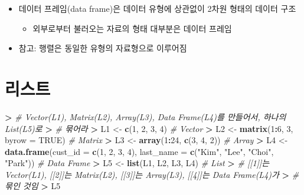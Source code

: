 \documentclass[11pt,a4paper]{book}
\newenvironment{Shaded}{\begin{snugshade}}{\end{snugshade}}
\newcommand{\KeywordTok}[1]{\textcolor[rgb]{0.13,0.29,0.53}{\textbf{#1}}}
\newcommand{\DataTypeTok}[1]{\textcolor[rgb]{0.13,0.29,0.53}{#1}}
\newcommand{\DecValTok}[1]{\textcolor[rgb]{0.00,0.00,0.81}{#1}}
\newcommand{\StringTok}[1]{\textcolor[rgb]{0.31,0.60,0.02}{#1}}
\newcommand{\CommentTok}[1]{\textcolor[rgb]{0.56,0.35,0.01}{\textit{#1}}}
\newcommand{\OtherTok}[1]{\textcolor[rgb]{0.56,0.35,0.01}{#1}}
\newcommand{\OperatorTok}[1]{\textcolor[rgb]{0.81,0.36,0.00}{\textbf{#1}}}
\newcommand{\ErrorTok}[1]{\textcolor[rgb]{0.64,0.00,0.00}{\textbf{#1}}}
\newcommand{\NormalTok}[1]{#1}
\providecommand{\tightlist}{%
  \setlength{\itemsep}{0pt}\setlength{\parskip}{0pt}}
\theoremstyle{definition}
\theoremstyle{definition}
\theoremstyle{definition}
\theoremstyle{remark}
\begin{document}
\begin{itemize}
\tightlist
\item
  데이터 프레임(data frame)은 데이터 유형에 상관없이 2차원 형태의 데이터
  구조

  \begin{itemize}
  \tightlist
  \item
    외부로부터 불러오는 자료의 형태 대부분은 데이터 프레임
  \end{itemize}
\item
  참고: 행렬은 동일한 유형의 자료형으로 이루어짐
\end{itemize}

\section{리스트}

\footnotesize

\begin{Shaded}
\begin{Highlighting}[]
\OperatorTok{>}\StringTok{ }\CommentTok{# Vector(L1), Matrix(L2), Array(L3), Data Frame(L4)를 만들어서, 하나의 List(L5)로}
\ErrorTok{>}\StringTok{ }\CommentTok{# 묶어라}
\ErrorTok{>}\StringTok{ }\NormalTok{L1 <-}\StringTok{ }\KeywordTok{c}\NormalTok{(}\DecValTok{1}\NormalTok{, }\DecValTok{2}\NormalTok{, }\DecValTok{3}\NormalTok{, }\DecValTok{4}\NormalTok{)  }\CommentTok{# Vector}
\OperatorTok{>}\StringTok{ }\NormalTok{L2 <-}\StringTok{ }\KeywordTok{matrix}\NormalTok{(}\DecValTok{1}\OperatorTok{:}\DecValTok{6}\NormalTok{, }\DecValTok{3}\NormalTok{, }\DataTypeTok{byrow =} \OtherTok{TRUE}\NormalTok{)  }\CommentTok{# Matrix}
\OperatorTok{>}\StringTok{ }\NormalTok{L3 <-}\StringTok{ }\KeywordTok{array}\NormalTok{(}\DecValTok{1}\OperatorTok{:}\DecValTok{24}\NormalTok{, }\KeywordTok{c}\NormalTok{(}\DecValTok{3}\NormalTok{, }\DecValTok{4}\NormalTok{, }\DecValTok{2}\NormalTok{))  }\CommentTok{# Array}
\OperatorTok{>}\StringTok{ }\NormalTok{L4 <-}\StringTok{ }\KeywordTok{data.frame}\NormalTok{(}\DataTypeTok{cust_id =} \KeywordTok{c}\NormalTok{(}\DecValTok{1}\NormalTok{, }\DecValTok{2}\NormalTok{, }\DecValTok{3}\NormalTok{, }\DecValTok{4}\NormalTok{), }\DataTypeTok{last_name =} \KeywordTok{c}\NormalTok{(}\StringTok{"Kim"}\NormalTok{, }\StringTok{"Lee"}\NormalTok{, }\StringTok{"Choi"}\NormalTok{, }\StringTok{"Park"}\NormalTok{))  }\CommentTok{# Data Frame}
\OperatorTok{>}\StringTok{ }\NormalTok{L5 <-}\StringTok{ }\KeywordTok{list}\NormalTok{(L1, L2, L3, L4)  }\CommentTok{# List}
\OperatorTok{>}\StringTok{ }\CommentTok{# [[1]]는 Vector(L1), [[2]]는 Matrix(L2), [[3]]는 Array(L3), [[4]]는 Data Frame(L4)가}
\ErrorTok{>}\StringTok{ }\CommentTok{# 묶인 것임}
\ErrorTok{>}\StringTok{ }\NormalTok{L5}
\end{Highlighting}
\end{Shaded}
\end{document}
